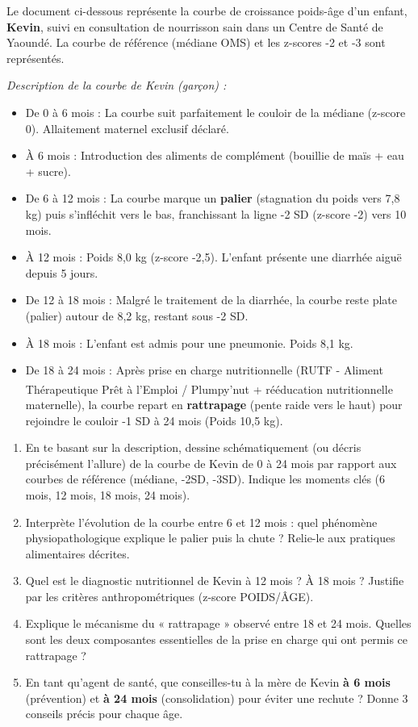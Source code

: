 \documentclass[11pt]{article}
\begin{document}
\begin{exercice}
Le document ci-dessous représente la courbe de croissance poids-âge d'un enfant, \textbf{Kevin}, suivi en consultation de nourrisson sain dans un Centre de Santé de Yaoundé. La courbe de référence (médiane OMS) et les z-scores -2 et -3 sont représentés.

\textit{Description de la courbe de Kevin (garçon) :}
\begin{itemize}
    \item De 0 à 6 mois : La courbe suit parfaitement le couloir de la médiane (z-score 0). Allaitement maternel exclusif déclaré.
    \item À 6 mois : Introduction des aliments de complément (bouillie de maïs + eau + sucre).
    \item De 6 à 12 mois : La courbe marque un \textbf{palier} (stagnation du poids vers 7,8 kg) puis s'infléchit vers le bas, franchissant la ligne -2 SD (z-score -2) vers 10 mois.
    \item À 12 mois : Poids 8,0 kg (z-score -2,5). L'enfant présente une diarrhée aiguë depuis 5 jours.
    \item De 12 à 18 mois : Malgré le traitement de la diarrhée, la courbe reste plate (palier) autour de 8,2 kg, restant sous -2 SD.
    \item À 18 mois : L'enfant est admis pour une pneumonie. Poids 8,1 kg.
    \item De 18 à 24 mois : Après prise en charge nutritionnelle (RUTF - Aliment Thérapeutique Prêt à l'Emploi / Plumpy'nut\textsuperscript{\textregistered} + rééducation nutritionnelle maternelle), la courbe repart en \textbf{rattrapage} (pente raide vers le haut) pour rejoindre le couloir -1 SD à 24 mois (Poids 10,5 kg).
\end{itemize}
\begin{enumerate}
    \item En te basant sur la description, dessine schématiquement (ou décris précisément l'allure) de la courbe de Kevin de 0 à 24 mois par rapport aux courbes de référence (médiane, -2SD, -3SD). Indique les moments clés (6 mois, 12 mois, 18 mois, 24 mois).
    \item Interprète l'évolution de la courbe entre 6 et 12 mois : quel phénomène physiopathologique explique le palier puis la chute ? Relie-le aux pratiques alimentaires décrites.
    \item Quel est le diagnostic nutritionnel de Kevin à 12 mois ? À 18 mois ? Justifie par les critères anthropométriques (z-score POIDS/ÂGE).
    \item Explique le mécanisme du « rattrapage » observé entre 18 et 24 mois. Quelles sont les deux composantes essentielles de la prise en charge qui ont permis ce rattrapage ?
    \item En tant qu'agent de santé, que conseilles-tu à la mère de Kevin \textbf{à 6 mois} (prévention) et \textbf{à 24 mois} (consolidation) pour éviter une rechute ? Donne 3 conseils précis pour chaque âge.
\end{enumerate}
\end{exercice}
\end{document}
